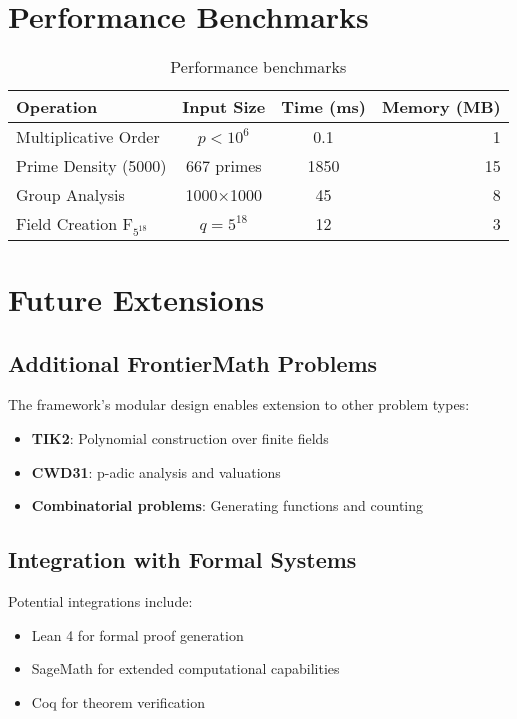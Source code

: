 \documentclass[11pt]{article}
\begin{document}
\section{Performance Benchmarks}

\begin{table}[H]
\centering
\begin{tabular}{@{}lccr@{}}
\toprule
Operation & Input Size & Time (ms) & Memory (MB) \\
\midrule
Multiplicative Order & $p < 10^6$ & 0.1 & 1 \\
Prime Density (5000) & 667 primes & 1850 & 15 \\
Group Analysis & 1000×1000 & 45 & 8 \\
Field Creation F$_{5^{18}}$ & $q = 5^{18}$ & 12 & 3 \\
\bottomrule
\end{tabular}
\caption{Performance benchmarks}
\end{table}

\section{Future Extensions}

\subsection{Additional FrontierMath Problems}

The framework's modular design enables extension to other problem types:

\begin{itemize}
\item \textbf{TIK2}: Polynomial construction over finite fields
\item \textbf{CWD31}: p-adic analysis and valuations
\item \textbf{Combinatorial problems}: Generating functions and counting
\end{itemize}

\subsection{Integration with Formal Systems}

Potential integrations include:

\begin{itemize}
\item Lean 4 for formal proof generation
\item SageMath for extended computational capabilities
\item Coq for theorem verification
\end{itemize}
\end{document}
